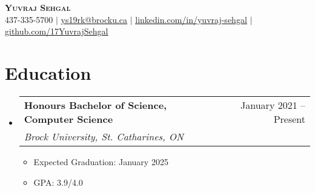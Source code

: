 \documentclass[letterpaper,11pt]{article}
\makeatletter
\newcommand{\resumeItem}[1]{
  \item\small{
    {#1 \vspace{-2pt}}
  }
}
\newcommand{\resumeSubheading}[4]{
  \vspace{-2pt}\item
    \begin{tabular*}{0.97\textwidth}[t]{l@{\extracolsep{\fill}}r}
      \textbf{#1} & #2 \\
      \textit{\small#3} & \textit{\small #4} \\
    \end{tabular*}\vspace{-7pt}
}
\newcommand{\resumeSubHeadingListStart}{\begin{itemize}[leftmargin=0.15in, label={}]}
\newcommand{\resumeSubHeadingListEnd}{\end{itemize}}
\newcommand{\resumeItemListStart}{\begin{itemize}}
\newcommand{\resumeItemListEnd}{\end{itemize}\vspace{-5pt}}
\makeatother
\begin{document}
\begin{center}
    \textbf{\Huge \scshape Yuvraj Sehgal}\\
    \small 437-335-5700 $|$ \href{mailto:ys19rk@brocku.ca4}{\underline{ys19rk@brocku.ca}} $|$ \href{https://ca.linkedin.com/in/yuvraj-sehgal}{\underline{linkedin.com/in/yuvraj-sehgal}} $|$ \href{https://github.com/17YuvrajSehgal}{\underline{github.com/17YuvrajSehgal}}
\end{center}

\section{Education}
\resumeSubHeadingListStart
  \resumeSubheading
    {Honours Bachelor of Science, Computer Science}{January 2021 -- Present}
    {Brock University, St. Catharines, ON}{}
    \resumeItemListStart
      \resumeItem{Expected Graduation:}{January 2025}
      \resumeItem{GPA:}{3.9/4.0}
    \resumeItemListEnd
\resumeSubHeadingListEnd


\end{document}
